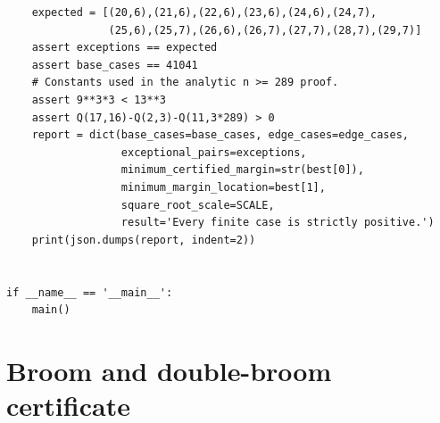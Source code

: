 \documentclass[11pt,a4paper]{article}
\theoremstyle{remark}\newtheorem{remark}[theorem]{Remark}
\begin{document}
\begin{lstlisting}
    expected = [(20,6),(21,6),(22,6),(23,6),(24,6),(24,7),
                (25,6),(25,7),(26,6),(26,7),(27,7),(28,7),(29,7)]
    assert exceptions == expected
    assert base_cases == 41041
    # Constants used in the analytic n >= 289 proof.
    assert 9**3*3 < 13**3
    assert Q(17,16)-Q(2,3)-Q(11,3*289) > 0
    report = dict(base_cases=base_cases, edge_cases=edge_cases,
                  exceptional_pairs=exceptions,
                  minimum_certified_margin=str(best[0]),
                  minimum_margin_location=best[1],
                  square_root_scale=SCALE,
                  result='Every finite case is strictly positive.')
    print(json.dumps(report, indent=2))


if __name__ == '__main__':
    main()

\end{lstlisting}
\section{Broom and double-broom certificate}\label{app:brooms}
\end{document}

